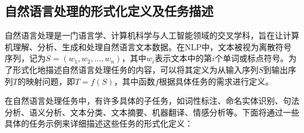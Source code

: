 
\subsection{自然语言处理的形式化定义及任务描述} \label{NLP_Def}

自然语言处理是一门语言学、计算机科学与人工智能领域的交叉学科，旨在让计算机理解、分析、生成和处理自然语言文本数据。在NLP中，文本被视为离散符号序列，记为$S=(w_1, w_2, ..., w_n)$，其中$w_i$表示文本中的第$i$个单词或标点符号。为了形式化地描述自然语言处理任务的内容，可以将其定义为从输入序列$S$到输出序列$T$的映射问题，即$T=f(S)$，其中函数$f$根据具体任务的需求进行定义。

在自然语言处理任务中，有许多具体的子任务，如词性标注、命名实体识别、句法分析、语义分析、文本分类、文本摘要、机器翻译、情感分析等。下面将通过一些具体的任务示例来详细描述这些任务的形式化定义：

